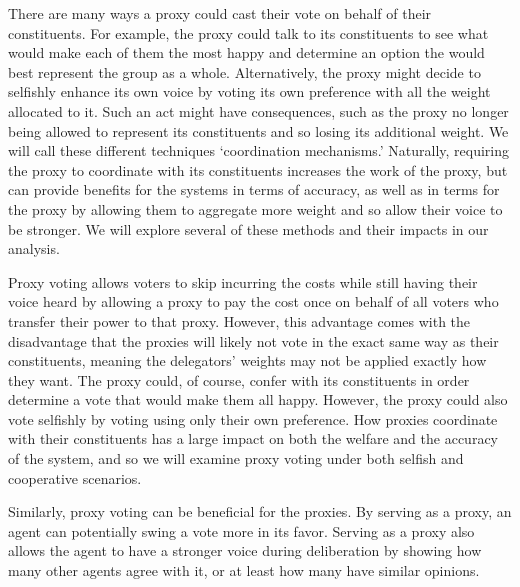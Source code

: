 There are many ways a proxy could cast their vote on behalf of their constituents.
For example, the proxy could talk to its constituents to see what would make each of
them the most happy and determine an option the would best represent the group as a
whole.
Alternatively, the proxy might decide to selfishly enhance its own voice by voting its
own preference with all the weight allocated to it.
Such an act might have consequences, such as the proxy no longer being allowed to
represent its constituents and so losing its additional weight.
We will call these different techniques `coordination mechanisms.'
Naturally, requiring the proxy to coordinate with its constituents increases the work
of the proxy, but can provide benefits for the systems in terms of accuracy, as well
as in terms for the proxy by allowing them to aggregate more weight and so allow
their voice to be stronger.
We will explore several of these methods and their impacts in our analysis.

Proxy voting allows voters to skip incurring the costs while still having their voice
heard by allowing a proxy to pay the cost once on behalf of all voters who transfer
their power to that proxy.
However, this advantage comes with the disadvantage that the proxies will likely not
vote in the exact same way as their constituents, meaning the delegators' weights may
not be applied exactly how they want.
The proxy could, of course, confer with its constituents in order determine a vote
that would make them all happy.
However, the proxy could also vote selfishly by voting using only their own preference.
How proxies coordinate with their constituents has a large impact on both the welfare
and the accuracy of the system, and so we will examine proxy voting under both
selfish and cooperative scenarios.

Similarly, proxy voting can be beneficial for the proxies.
By serving as a proxy, an agent can potentially swing a vote more in its favor.
Serving as a proxy also allows the agent to have a stronger voice during
deliberation by showing how many other agents agree with it, or at least how many
have similar opinions.

